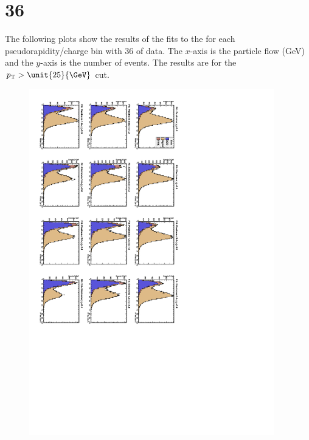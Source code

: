 \section{\unit{36}{\invpb}}

The following plots show the results of the fits to the \ETm for each
pseudorapidity/charge bin with \unit{36}{\invpb} of data. The $x$-axis is the
particle flow \ETm (GeV) and the $y$-axis is the number of events. The results
are for the $\Pt > \unit{25}{\GeV}$ cut.

\begin{figure}
\begin{center}
\includegraphics[trim = 80mm 100mm 0mm 0mm, clip, angle=90, width=0.95\textwidth]{Dec22_data}

\end{center}
\end{figure}
